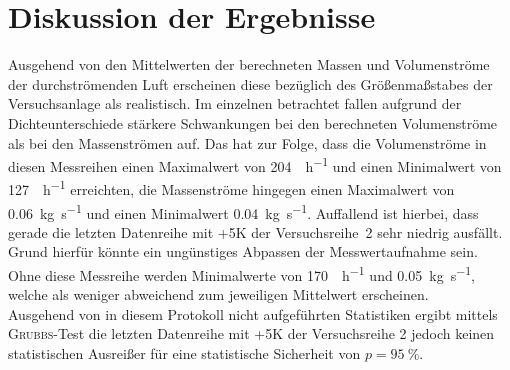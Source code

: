 \newpage
\section{Diskussion der Ergebnisse}
\label{sec:diskussion}

Ausgehend von den Mittelwerten der berechneten Massen und Volumenströme der durchströmenden Luft erscheinen diese bezüglich des Größenmaßstabes der Versuchsanlage als realistisch. Im einzelnen betrachtet fallen aufgrund der Dichteunterschiede stärkere Schwankungen bei den berechneten Volumenströme als bei den Massenströmen auf. Das hat zur Folge, dass die Volumenströme in diesen Messreihen einen Maximalwert von \SI{204}{\kmeter \per \hour } und einen Minimalwert von \SI{127}{\kmeter\per \hour} erreichten, die Massenströme hingegen einen Maximalwert von \SI{0,06}{\kg \per \second} und einen Minimalwert \SI{0,04}{\kg \per \second}. Auffallend ist hierbei, dass gerade die letzten Datenreihe mit +5K der \mbox{Versuchsreihe 2} sehr niedrig ausfällt. Grund hierfür könnte ein ungünstiges Abpassen der Messwertaufnahme sein. Ohne diese Messreihe werden Minimalwerte von \SI{170}{\kmeter \per \hour} und \SI{0,05}{\kg \per \second}, welche als weniger abweichend zum jeweiligen Mittelwert erscheinen.\\
Ausgehend von in diesem Protokoll nicht aufgeführten Statistiken ergibt mittels \textsc{Grubbs}-Test die letzten Datenreihe mit +5K der Versuchsreihe 2 jedoch keinen statistischen Ausreißer für eine statistische Sicherheit von $p =\SI{95}{\percent}$.\\


